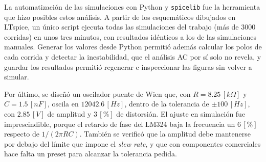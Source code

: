 La automatización de las simulaciones con Python y \texttt{spicelib} fue la herramienta que hizo posibles estos análisis. A partir de los esquemáticos dibujados en LTspice, un único script ejecuta todas las simulaciones del trabajo (más de $3000$ corridas) en unos tres minutos, con resultados idénticos a los de las simulaciones manuales. Generar los valores desde Python permitió además calcular los polos de cada corrida y detectar la inestabilidad, que el análisis AC por sí solo no revela, y guardar los resultados permitió regenerar e inspeccionar las figuras sin volver a simular.

Por último, se diseñó un oscilador puente de Wien que, con $R = 8.25 \, [k\Omega]$ y $C = 1.5 \, [nF]$, oscila en $12042.6 \, [Hz]$, dentro de la tolerancia de $\pm 100 \, [Hz]$, con $2.85 \, [V]$ de amplitud y $3 \, [\%]$ de distorsión. El ajuste en simulación fue imprescindible, porque el retardo de fase del LM324 baja la frecuencia un $6 \, [\%]$ respecto de $1/(2\pi RC)$. También se verificó que la amplitud debe mantenerse por debajo del límite que impone el \textit{slew rate}, y que con componentes comerciales hace falta un preset para alcanzar la tolerancia pedida.
